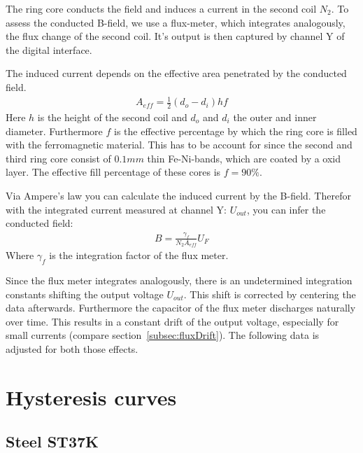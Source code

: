 \documentclass[a4paper,10pt,twocolumn]{article}
\begin{document}
    The ring core conducts the field and induces a current in the second coil $N_2$.
    To assess the conducted B-field, we use a flux-meter, which integrates analogously, the flux change of the second coil.
    It's output is then captured by channel Y of the digital interface.
    
    The induced current depends on the effective area penetrated by the conducted field.
    \begin{align}
        \label{eq:EffectiveAreaOfInductionCoil}
        A_{eff} = \frac{1}{2} (d_o - d_i) h f
    \end{align}
    Here $h$ is the height of the second coil and $d_o$ and $d_i$ the outer and inner diameter.
    Furthermore $f$ is the effective percentage by which the ring core is filled with the ferromagnetic material.
    This has to be account for since the second and third ring core consist of $0.1 mm$ thin Fe-Ni-bands, which are coated by a oxid layer.
    The effective fill percentage of these cores is $f = 90\%$.
    
    Via Ampere's law you can calculate the induced current by the B-field.
    Therefor with the integrated current measured at channel Y: $U_{out}$, you can infer the conducted field:
    \begin{align}
        \label{eq:CalculateBField} 
        B = \frac{\gamma_f}{N_2 A_{eff}} U_{F}
    \end{align}
    Where $\gamma_f$ is the integration factor of the flux meter.
    
    Since the flux meter integrates analogously, there is an undetermined integration constants shifting the output
    voltage $U_{out}$.
    This shift is corrected by centering the data afterwards.
    Furthermore the capacitor of the flux meter discharges naturally over time.
    This results in a constant drift of the output voltage,
    especially for small currents (compare section~\ref{subsec:fluxDrift}).
    The following data is adjusted for both those effects.
    
    \section{Hysteresis curves}
    \subsection{Steel ST37K}
    \label{subsec:steel}
    
    
\end{document}
